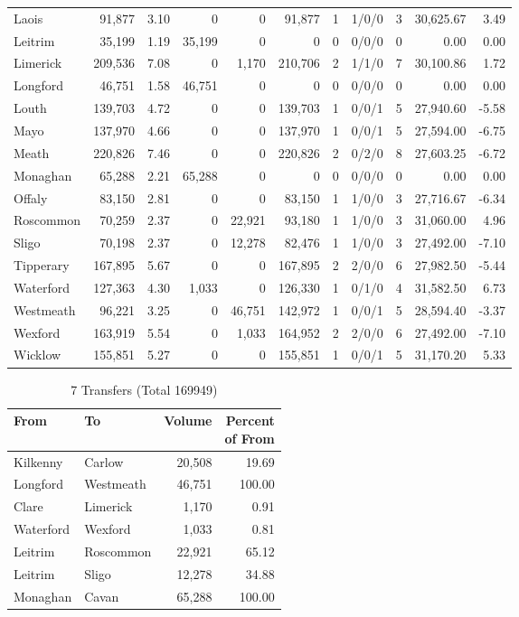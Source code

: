 \documentclass[a4paper]{article}
\begin{document}
\begin{longtable}{lrrrrrrlrrr}
Laois&91,877& 3.10&0&0&91,877&1&1/0/0&3&30,625.67& 3.49\\ 
Leitrim&35,199& 1.19&35,199&0&0&0&0/0/0&0& 0.00& 0.00\\ 
Limerick&209,536& 7.08&0&1,170&210,706&2&1/1/0&7&30,100.86& 1.72\\ 
Longford&46,751& 1.58&46,751&0&0&0&0/0/0&0& 0.00& 0.00\\ 
Louth&139,703& 4.72&0&0&139,703&1&0/0/1&5&27,940.60&-5.58\\ 
Mayo&137,970& 4.66&0&0&137,970&1&0/0/1&5&27,594.00&-6.75\\ 
Meath&220,826& 7.46&0&0&220,826&2&0/2/0&8&27,603.25&-6.72\\ 
Monaghan&65,288& 2.21&65,288&0&0&0&0/0/0&0& 0.00& 0.00\\ 
Offaly&83,150& 2.81&0&0&83,150&1&1/0/0&3&27,716.67&-6.34\\ 
Roscommon&70,259& 2.37&0&22,921&93,180&1&1/0/0&3&31,060.00& 4.96\\ 
Sligo&70,198& 2.37&0&12,278&82,476&1&1/0/0&3&27,492.00&-7.10\\ 
Tipperary&167,895& 5.67&0&0&167,895&2&2/0/0&6&27,982.50&-5.44\\ 
Waterford&127,363& 4.30&1,033&0&126,330&1&0/1/0&4&31,582.50& 6.73\\ 
Westmeath&96,221& 3.25&0&46,751&142,972&1&0/0/1&5&28,594.40&-3.37\\ 
Wexford&163,919& 5.54&0&1,033&164,952&2&2/0/0&6&27,492.00&-7.10\\ 
Wicklow&155,851& 5.27&0&0&155,851&1&0/0/1&5&31,170.20& 5.33\\ 
\end{longtable}

\begin{table}[htbp]
\caption{7 Transfers (Total 169949)}
\centering
\begin{tabular}{llrr} \toprule
From &To &Volume &\shortstack{Percent\\of From} \\ \midrule
Kilkenny&Carlow&20,508&19.69\\ 
Longford&Westmeath&46,751&100.00\\ 
Clare&Limerick&1,170& 0.91\\ 
Waterford&Wexford&1,033& 0.81\\ 
Leitrim&Roscommon&22,921&65.12\\ 
Leitrim&Sligo&12,278&34.88\\ 
Monaghan&Cavan&65,288&100.00\\ 
\bottomrule
\end{tabular}
\end{table}
\end{document}
